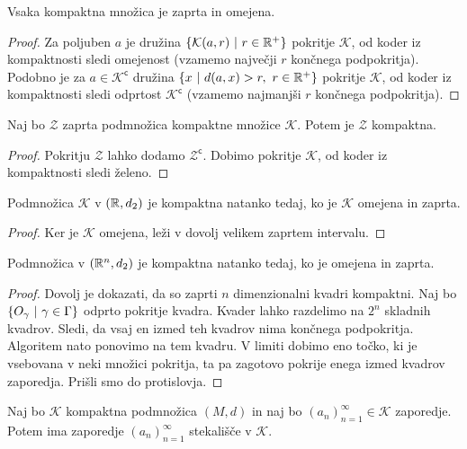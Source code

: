 \documentclass[12pt, a4paper]{article}
\begin{document}
\begin{trditev}
Vsaka kompaktna množica  je zaprta in omejena.
\end{trditev}

\begin{proof}
Za poljuben $a$ je družina $\left\{\mathcal{K}(a,r)~\middle\vert~r\in\mathbb{R}^+\right\}$ pokritje $\mathcal{K}$, od koder iz kompaktnosti sledi omejenost (vzamemo največji $r$ končnega podpokritja). Podobno je za $a\in\mathcal{K}^\mathsf{c}$ družina $\left\{x~\middle\vert~d(a,x)>r,~r\in\mathbb{R}^+\right\}$ pokritje $\mathcal{K}$, od koder iz kompaktnosti sledi odprtost $\mathcal{K}^\mathsf{c}$ (vzamemo najmanjši $r$ končnega podpokritja).
\end{proof}

\begin{trditev}
Naj bo $\mathcal{Z}$ zaprta podmnožica kompaktne množice $\mathcal{K}$. Potem je $\mathcal{Z}$ kompaktna.
\end{trditev}

\begin{proof}
Pokritju $\mathcal{Z}$ lahko dodamo $\mathcal{Z}^\mathsf{c}$. Dobimo pokritje $\mathcal{K}$, od koder iz kompaktnosti sledi želeno.
\end{proof}

\begin{posledica}
Podmnožica $\mathcal{K}$ v $(\mathbb{R},d_2)$ je kompaktna natanko tedaj, ko je $\mathcal{K}$ omejena in zaprta.
\end{posledica}

\begin{proof}
Ker je $\mathcal{K}$ omejena, leži v dovolj velikem zaprtem intervalu.
\end{proof}

\begin{izrek}
Podmnožica v $(\mathbb{R}^n,d_2)$ je kompaktna natanko tedaj, ko je omejena in zaprta.
\end{izrek}

\begin{proof}
Dovolj je dokazati, da so zaprti $n$ dimenzionalni kvadri kompaktni. Naj bo $\left\{O_\gamma~\middle\vert~\gamma\in\Gamma\right\}$ odprto pokritje kvadra. Kvader lahko razdelimo na $2^n$ skladnih kvadrov. Sledi, da vsaj en izmed teh kvadrov nima končnega podpokritja. Algoritem nato ponovimo na tem kvadru. V limiti dobimo eno točko, ki je vsebovana v neki množici pokritja, ta pa zagotovo pokrije enega izmed kvadrov zaporedja. Prišli smo do protislovja.
\end{proof}

\begin{izrek}
Naj bo $\mathcal{K}$ kompaktna podmnožica $(M,d)$ in naj bo $(a_n)_{n=1}^\infty\in\mathcal{K}$ zaporedje. Potem ima zaporedje $(a_n)_{n=1}^\infty$ stekališče v $\mathcal{K}$.
\end{izrek}
\end{document}
